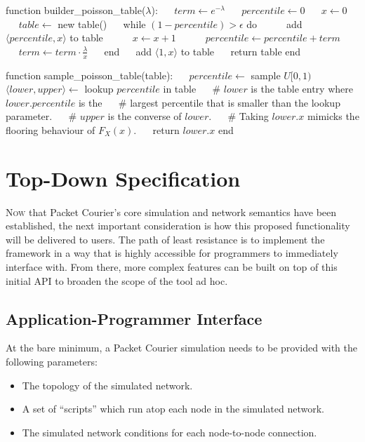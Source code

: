 \newpage

\begin{algorithm}[caption={Poisson distribution builder and sampler.},label={alg:poisson_builder_and_sampler},
    captionpos=b]
    function builder_poisson_table($\lambda$):
    $\quad$ $term \gets e^{-\lambda}$
    $\quad$ $percentile \gets 0$
    $\quad$ $x \gets 0$
    $\quad$ $table \gets$ new table()
    $\quad$ while $(1 - percentile) > \epsilon$ do
    $\quad$ $\quad$ add $\langle percentile, x \rangle$ to table
    $\quad$ $\quad$ $x \gets x + 1$
    $\quad$ $\quad$ $percentile \gets percentile + term$
    $\quad$ $\quad$ $term \gets term \cdot \frac{\lambda}{x}$
    $\quad$ end
    $\quad$ add  $\langle 1, x \rangle$ to table
    $\quad$ return table
    end

    function sample_poisson_table(table):
    $\quad$ $percentile \gets$ sample $U[0, 1)$
    $\quad$ $\langle lower, upper \rangle \gets$ lookup $percentile$ in table
    $\quad$ # $lower$ is the table entry where $lower.percentile$ is the
    $\quad$ # largest percentile that is smaller than the lookup parameter.
    $\quad$ # $upper$ is the converse of $lower$.
    $\quad$ # Taking $lower.x$ mimicks the flooring behaviour of $F_X(x)$.
    $\quad$ return $lower.x$
    end
\end{algorithm}


\section{Top-Down Specification}\label{section:top_down_specification}

\lettrine{N}{ow} that Packet Courier's core simulation and network semantics have been established, the next
important consideration is how this proposed functionality will be delivered to users. The path of least resistance
is to implement the framework in a way that is highly accessible for programmers to immediately interface with. From
there, more complex features can be built on top of this initial API to broaden the scope of the tool ad hoc.

\subsection{Application-Programmer Interface}\label{subsection:application_programmer_interface}

At the bare minimum, a Packet Courier simulation needs to be provided with the following parameters:
\begin{itemize}
    \item The topology of the simulated network.
    \item A set of ``scripts'' which run atop each node in the simulated network.
    \item The simulated network conditions for each node-to-node connection.
\end{itemize}

